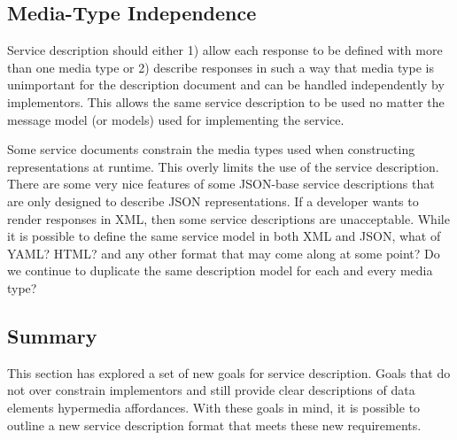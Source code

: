 \documentclass{wsrest2014}
\begin{document}
\subsection{Media-Type Independence}
\label{_media_type_independence}
 \par{}Service description should either 1) allow each response to be defined with more than one media type or 2) describe responses in such a way that media type is unimportant for the description document and can be handled independently by implementors. This allows the same service description to be used no matter the message model (or models) used for implementing the service.
 \par{}Some service documents constrain the media types used when constructing representations at runtime. This overly limits the use of the service description. There are some very nice features of some JSON-base service descriptions that are only designed to describe JSON representations. If a developer wants to render responses in XML, then some service descriptions are unacceptable. While it is possible to define the same service model in both XML and JSON, what of YAML? HTML? and any other format that may come along at some point? Do we continue to duplicate the same description model for each and every media type?
\hypertarget{_summary_3}{}
\subsection{Summary}
\label{_summary_3}
 \par{}This section has explored a set of new goals for service description. Goals that do not over constrain implementors and still provide clear descriptions of data elements hypermedia affordances. With these goals in mind, it is possible to outline a new service description format that meets these new requirements.
\hypertarget{_application_level_profile_semantics_alps}{}
\end{document}
